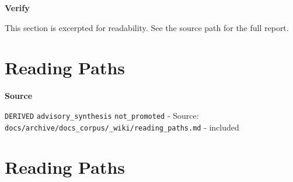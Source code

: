 \documentclass[10.5pt,a4paper,openany]{book}
\newcommand{\vonecallout}[3]{\par\medskip\noindent\begingroup\setlength{\fboxsep}{7pt}\colorbox{DomCalloutBg}{\parbox{0.94\linewidth}{\textbf{\textcolor{#1}{#2}}\par #3}}\endgroup\par\medskip}
\begin{document}
\vonecallout{DomAmber}{Verify}{This section is excerpted for readability.\allowbreak{} See the source path for the full report.\allowbreak{}}



\section{Reading Paths}

\vonecallout{DomSlate}{Source}{\texttt{DERIVED} \texttt{advisory\_\allowbreak{}synthesis} \texttt{not\_\allowbreak{}promoted} -\allowbreak{} Source: \texttt{docs/\allowbreak{}archive/\allowbreak{}docs\_\allowbreak{}corpus/\allowbreak{}\_\allowbreak{}wiki/\allowbreak{}reading\_\allowbreak{}paths.\allowbreak{}md} -\allowbreak{} included}

\section{Reading Paths}
\end{document}
